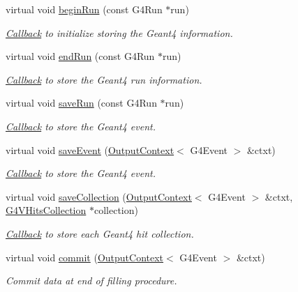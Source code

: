 \begin{DoxyCompactItemize}
virtual void \hyperlink{class_d_d4hep_1_1_simulation_1_1_geant4_output_action_afc8b13d72433d8f917555e952e1ce528}{beginRun} (const G4Run $\ast$run)
\begin{DoxyCompactList}\small\item\em \hyperlink{class_d_d4hep_1_1_callback}{Callback} to initialize storing the Geant4 information. \item\end{DoxyCompactList}\item 
virtual void \hyperlink{class_d_d4hep_1_1_simulation_1_1_geant4_output_action_ac89540100411ccec1804da9afbb843a4}{endRun} (const G4Run $\ast$run)
\begin{DoxyCompactList}\small\item\em \hyperlink{class_d_d4hep_1_1_callback}{Callback} to store the Geant4 run information. \item\end{DoxyCompactList}\item 
virtual void \hyperlink{class_d_d4hep_1_1_simulation_1_1_geant4_output_action_a4016b3e0ee787a3ac3d1fcd7a4c84a68}{saveRun} (const G4Run $\ast$run)
\begin{DoxyCompactList}\small\item\em \hyperlink{class_d_d4hep_1_1_callback}{Callback} to store the Geant4 event. \item\end{DoxyCompactList}\item 
virtual void \hyperlink{class_d_d4hep_1_1_simulation_1_1_geant4_output_action_a660080e931d757573839927ca99bfbed}{saveEvent} (\hyperlink{class_d_d4hep_1_1_simulation_1_1_geant4_output_action_1_1_output_context}{OutputContext}$<$ G4Event $>$ \&ctxt)
\begin{DoxyCompactList}\small\item\em \hyperlink{class_d_d4hep_1_1_callback}{Callback} to store the Geant4 event. \item\end{DoxyCompactList}\item 
virtual void \hyperlink{class_d_d4hep_1_1_simulation_1_1_geant4_output_action_aa43d1f01dbcb11ac1d937a878d87a90f}{saveCollection} (\hyperlink{class_d_d4hep_1_1_simulation_1_1_geant4_output_action_1_1_output_context}{OutputContext}$<$ G4Event $>$ \&ctxt, \hyperlink{class_g4_v_hits_collection}{G4VHitsCollection} $\ast$collection)
\begin{DoxyCompactList}\small\item\em \hyperlink{class_d_d4hep_1_1_callback}{Callback} to store each Geant4 hit collection. \item\end{DoxyCompactList}\item 
virtual void \hyperlink{class_d_d4hep_1_1_simulation_1_1_geant4_output_action_a1d83299b79de6a1a75e70ef5a9e4d3eb}{commit} (\hyperlink{class_d_d4hep_1_1_simulation_1_1_geant4_output_action_1_1_output_context}{OutputContext}$<$ G4Event $>$ \&ctxt)
\begin{DoxyCompactList}\small\item\em Commit data at end of filling procedure. \item\end{DoxyCompactList}\end{DoxyCompactItemize}
